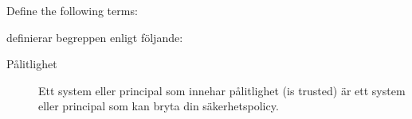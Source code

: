 \documentclass[a4paper,addpoints]{exam}
\begin{document}
\begin{questions}
%


  \question\label{q:foundations:E}
  Define the following terms:

  \begin{solution}
    \citet[ss.\ 13--14]{Anderson2008sea} definierar begreppen enligt följande:
    \begin{description}
      \item[Pålitlighet] Ett system eller principal som innehar pålitlighet 
        (\foreignlanguage{english}{is trusted}) är ett system eller principal 
        som kan bryta din säkerhetspolicy.


\end{description}
\end{solution}
\end{questions}
\end{document}
